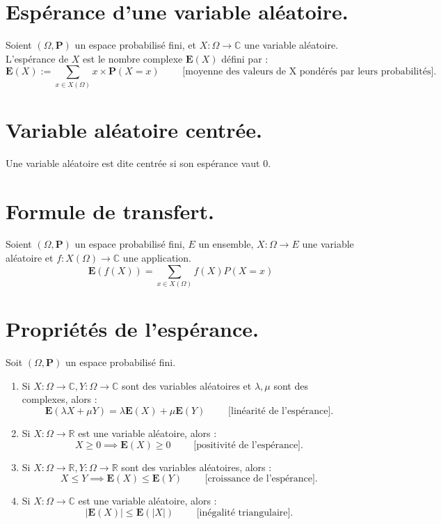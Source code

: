 \documentclass{article}
\begin{document}
\section{Espérance d'une variable aléatoire.}

Soient $(\Omega, \mathbf{P})$ un espace probabilisé fini, et $X : \Omega \longrightarrow \mathbb{C}$ une variable aléatoire. L'espérance de $X$ est le nombre complexe $\mathbf{E}(X)$ défini par : 
\[
    \mathbf{E}(X) := \sum_{x \in X(\Omega)}{x \times \mathbf{P}(X=x)} \qquad \text{ [moyenne des valeurs de X pondérés par leurs probabilités]}.
\]

\section{Variable aléatoire centrée.}
Une variable aléatoire est dite centrée si son espérance vaut $0$.

\section{Formule de transfert.}
Soient $(\Omega, \mathbf{P})$ un espace probabilisé fini, $E$ un ensemble, $X : \Omega \longrightarrow E$ une variable aléatoire et $f : X(\Omega) \longrightarrow \mathbb{C}$ une application.
\[
    \mathbf{E}(f(X)) = \sum_{x \in X(\Omega)}{f(X)P(X = x)}
\]

\section{Propriétés de l'espérance.}

Soit $(\Omega, \mathbf{P})$ un espace probabilisé fini. 
\begin{enumerate}[label=(\alph*)]
    \item Si $X : \Omega \longrightarrow \mathbb{C}, Y : \Omega \longrightarrow \mathbb{C}$ sont des variables aléatoires et $\lambda, \mu$ sont des complexes, alors : 
    \[
        \mathbf{E}(\lambda X + \mu Y) = \lambda \mathbf{E}(X) + \mu \mathbf{E}(Y) \qquad \text{ [linéarité de l'espérance].}
    \]
    \item Si $X : \Omega \longrightarrow \mathbb{R}$ est une variable aléatoire, alors :
    \[
        X \geq 0 \implies \mathbf{E}(X) \geq 0 \qquad \text{ [positivité de l'espérance].}
    \]
    \item Si $X : \Omega \longrightarrow \mathbb{R}, Y : \Omega \longrightarrow \mathbb{R}$ sont des variables aléatoires, alors : 
    \[
        X \leq Y \implies \mathbf{E}(X) \leq \mathbf{E}(Y) \qquad \text{ [croissance de l'espérance].}
    \]
    \item Si $X : \Omega \longrightarrow \mathbb{C}$ est une variable aléatoire, alors : 
    \[
        |\mathbf{E}(X)| \leq \mathbf{E}(|X|) \qquad \text{ [inégalité triangulaire].}
    \]
\end{enumerate}
\end{document}
